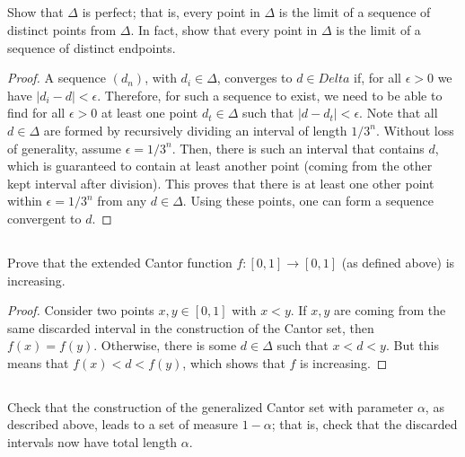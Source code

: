 \subsection{} Show that $\Delta$ is perfect; that is, every point in $\Delta$ is the  limit of a sequence of distinct points from $\Delta$. In fact, show that every point in $\Delta$ is the limit of a sequence of distinct endpoints.


\begin{proof}
A sequence $(d_n)$, with $d_i \in \Delta$, converges to $d \in Delta$ if, for all $\epsilon > 0$ we have $|d_i - d| < \epsilon$. Therefore, for such a sequence to exist, we need to be able to find for all $\epsilon > 0$ at least one point $d_t \in \Delta$ such that $|d - d_t| < \epsilon$. Note that all $d \in \Delta$ are formed by recursively dividing an interval of length $1/3^n$. Without loss of generality, assume $\epsilon = 1/3^n$. Then, there is such an interval that contains $d$, which is guaranteed to contain at least another point (coming from the other kept interval after division). This proves that there is at least one other point within $\epsilon = 1/3^n$ from any $d\in\Delta$. Using these points, one can form a sequence convergent to $d$.
\end{proof}



\subsection{} Prove that the extended Cantor function $f:[ 0, 1 ] \rightarrow [ 0, 1 ]$ (as  defined above)  is increasing.

\begin{proof}
Consider two points $x,y\in[0,1]$ with $x<y$. If $x,y$ are coming from the same discarded interval in the construction of the Cantor set, then $f(x)=f(y)$. Otherwise, there is some $d\in\Delta$ such that $x < d < y$. But this means that $f(x) < d < f(y)$, which shows that $f$ is increasing.
\end{proof}




\subsection{} Check that the construction of the generalized Cantor set with parameter $\alpha$, as described above,  leads  to a  set of measure  $1 -\alpha$; that is, check that the discarded intervals now have total length $\alpha$.

